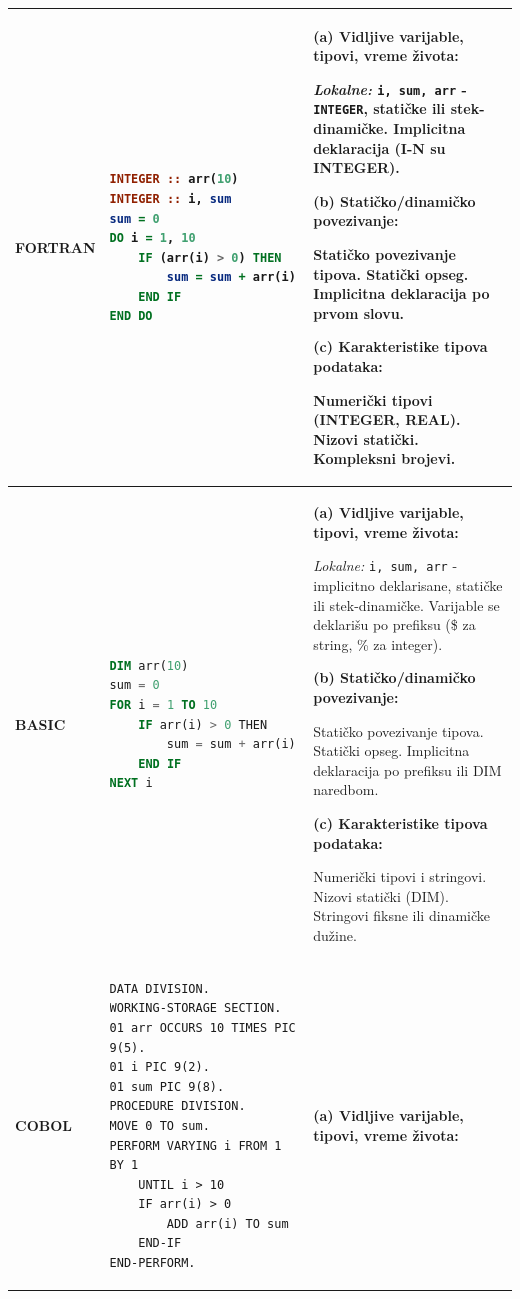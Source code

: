 \documentclass[12pt,a4paper]{article}
\begin{document}
\begin{longtable}{|p{2cm}|p{5cm}|p{8cm}|}
\textbf{FORTRAN} & 
\begin{lstlisting}[language=Fortran]
INTEGER :: arr(10)
INTEGER :: i, sum
sum = 0
DO i = 1, 10
    IF (arr(i) > 0) THEN
        sum = sum + arr(i)
    END IF
END DO
\end{lstlisting} & 
\textbf{(a) Vidljive varijable, tipovi, vreme života:}

\textit{Lokalne:} \texttt{i, sum, arr} - \texttt{INTEGER}, statičke ili stek-dinamičke. Implicitna deklaracija (I-N su INTEGER).

\vspace{0.2cm}
\textbf{(b) Statičko/dinamičko povezivanje:}

Statičko povezivanje tipova. Statički opseg. Implicitna deklaracija po prvom slovu.

\vspace{0.2cm}
\textbf{(c) Karakteristike tipova podataka:}

Numerički tipovi (INTEGER, REAL). Nizovi statički. Kompleksni brojevi. \\
\hline

\textbf{BASIC} & 
\begin{lstlisting}[language=Basic]
DIM arr(10)
sum = 0
FOR i = 1 TO 10
    IF arr(i) > 0 THEN
        sum = sum + arr(i)
    END IF
NEXT i
\end{lstlisting} & 
\textbf{(a) Vidljive varijable, tipovi, vreme života:}

\textit{Lokalne:} \texttt{i, sum, arr} - implicitno deklarisane, statičke ili stek-dinamičke. Varijable se deklarišu po prefiksu (\$ za string, \% za integer).

\vspace{0.2cm}
\textbf{(b) Statičko/dinamičko povezivanje:}

Statičko povezivanje tipova. Statički opseg. Implicitna deklaracija po prefiksu ili DIM naredbom.

\vspace{0.2cm}
\textbf{(c) Karakteristike tipova podataka:}

Numerički tipovi i stringovi. Nizovi statički (DIM). Stringovi fiksne ili dinamičke dužine. \\
\hline

\textbf{COBOL} & 
\begin{lstlisting}[language=Cobol]
DATA DIVISION.
WORKING-STORAGE SECTION.
01 arr OCCURS 10 TIMES PIC 9(5).
01 i PIC 9(2).
01 sum PIC 9(8).
PROCEDURE DIVISION.
MOVE 0 TO sum.
PERFORM VARYING i FROM 1 BY 1
    UNTIL i > 10
    IF arr(i) > 0
        ADD arr(i) TO sum
    END-IF
END-PERFORM.
\end{lstlisting} & 
\textbf{(a) Vidljive varijable, tipovi, vreme života:}


\end{longtable}
\end{document}
